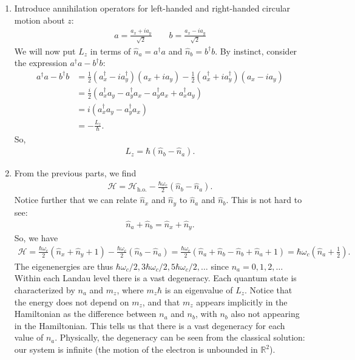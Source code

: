 \documentclass{article}
\theoremstyle{definition}
\newcommand{\ham}{\mathcal{H}}
\newcommand{\f}[2]{\frac{#1}{#2}}
\newcommand{\lp}{\left(}
\newcommand{\rp}{\right)}
\begin{document}
\begin{enumerate}[label=\alph*)]
	\item Introduce annihilation operators for left-handed and right-handed circular motion about $z$:
	\begin{align*}
		a = \f{a_x + ia_y}{\sqrt{2}} \quad\quad b = \f{a_x - i a_y}{\sqrt{2}}
	\end{align*}
	We will now put $L_z$ in terms of $\hat{n}_{a} = a^\dagger a $ and $\hat{n}_b = b^\dagger b$. By instinct, consider the expression $a^\dagger a - b^\dagger b$:
	\begin{align*}
		a^\dagger a - b^\dagger b 
		&= \f{1}{2}\lp a_x^\dagger - i a_y^\dagger \rp \lp a_x + i a_y \rp - \f{1}{2}\lp a_x^\dagger + ia_y^\dagger \rp \lp a_x -ia_y \rp\\
		&= \f{i}{2}\lp a_x^\dagger a_y - a_y^\dagger a_x - a_y^\dagger a_x + a_x^\dagger a_y \rp \\
		&= i\lp a_x^\dagger a_y - a_y^\dagger a_x \rp\\
		&= -\f{L_z}{\hbar}.
	\end{align*}
	So,
	\begin{align*}
		L_z = \hbar (\hat{n}_b - \hat{n}_a).
	\end{align*}
	
	
	\item From the previous parts, we find
	\begin{align*}
		\ham = \ham_\text{h.o.} - \f{\hbar\omega_c}{2} (\hat{n}_b - \hat{n}_a).
	\end{align*}
	Notice further that we can relate $\hat{n}_x$ and $\hat{n}_y$ to $\hat{n}_a$ and $\hat{n}_b$. This is not hard to see:
	\begin{align*}
		\hat{n}_a + \hat{n}_b =  \hat{n}_x + \hat{n}_y.
	\end{align*}	
	So, we have
	\begin{align*}
		\ham = \f{\hbar \omega_c}{2}\lp \hat{n}_x + \hat{n}_y + 1\rp - \f{\hbar \omega_c}{2}\lp \hat{n}_b - \hat{n}_a \rp = \f{\hbar \omega_c}{2}\lp \hat{n}_a + \hat{n}_b  -  \hat{n}_b + \hat{n}_a + 1\rp = \hbar \omega_c \lp \hat{n}_a + \f{1}{2} \rp. 
	\end{align*}
	The eigenenergies are thus $\hbar \omega_c/2, 3\hbar \omega_c/2, 5\hbar \omega_c/2,\dots$ since $n_a = 0,1,2,\dots$ Within each Landau level there is a vast degeneracy. Each quantum state is characterized by $n_a$ and $m_z$, where $m_z \hbar$ is an eigenvalue of $L_z$. Notice that the energy does not depend on $m_z$, and that $m_z$ appears implicitly in the Hamiltonian as the difference between $n_a$ and $n_b$, with $n_b$ also not appearing in the Hamiltonian. This tells us that there is a vast degeneracy for each value of $n_a$. Physically, the degeneracy can be seen from the classical solution: our system is infinite (the motion of the electron is unbounded in $\mathbb{R}^2$).


\end{enumerate}
\end{document}
